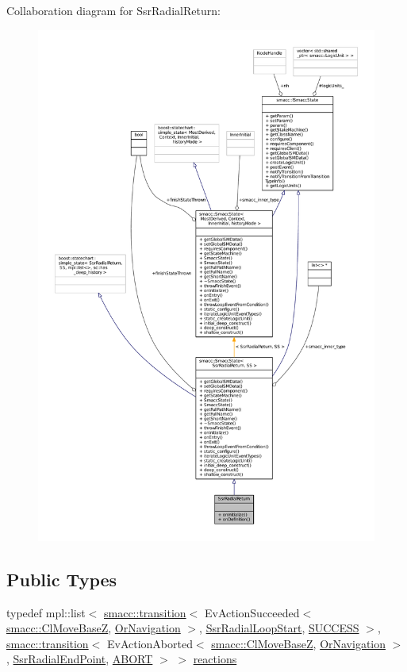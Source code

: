 Collaboration diagram for Ssr\+Radial\+Return\+:
\nopagebreak
\begin{figure}[H]
\begin{center}
\leavevmode
\includegraphics[width=350pt]{structSsrRadialReturn__coll__graph}
\end{center}
\end{figure}
\subsection*{Public Types}
\begin{DoxyCompactItemize}
\item 
typedef mpl\+::list$<$ \hyperlink{classsmacc_1_1transition}{smacc\+::transition}$<$ Ev\+Action\+Succeeded$<$ \hyperlink{classsmacc_1_1ClMoveBaseZ}{smacc\+::\+Cl\+Move\+BaseZ}, \hyperlink{classOrNavigation}{Or\+Navigation} $>$, \hyperlink{structSsrRadialLoopStart}{Ssr\+Radial\+Loop\+Start}, \hyperlink{classSUCCESS}{S\+U\+C\+C\+E\+SS} $>$, \hyperlink{classsmacc_1_1transition}{smacc\+::transition}$<$ Ev\+Action\+Aborted$<$ \hyperlink{classsmacc_1_1ClMoveBaseZ}{smacc\+::\+Cl\+Move\+BaseZ}, \hyperlink{classOrNavigation}{Or\+Navigation} $>$, \hyperlink{structSsrRadialEndPoint}{Ssr\+Radial\+End\+Point}, \hyperlink{classABORT}{A\+B\+O\+RT} $>$ $>$ \hyperlink{structSsrRadialReturn_aab8eb4d92c8078db56b4fa533dd9b348}{reactions}
\end{DoxyCompactItemize}
